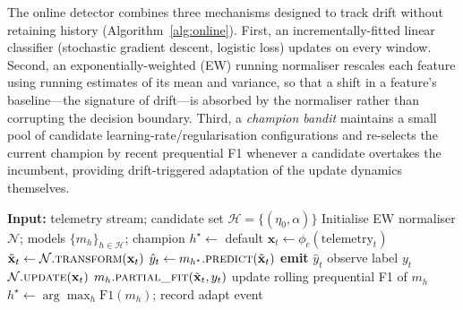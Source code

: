 \documentclass[pdflatex,sn-mathphys-num]{sn-jnl}%
\theoremstyle{thmstyleone}%
\theoremstyle{thmstyletwo}%
\theoremstyle{thmstylethree}%
\begin{document}
The online detector combines three mechanisms designed to track drift without retaining history (Algorithm~\ref{alg:online}). First, an incrementally-fitted linear classifier (stochastic gradient descent, logistic loss) updates on every window. Second, an exponentially-weighted (EW) running normaliser rescales each feature using running estimates of its mean and variance, so that a shift in a feature's baseline---the signature of drift---is absorbed by the normaliser rather than corrupting the decision boundary. Third, a \emph{champion bandit} maintains a small pool of candidate learning-rate/regularisation configurations and re-selects the current champion by recent prequential F1 whenever a candidate overtakes the incumbent, providing drift-triggered adaptation of the update dynamics themselves.

\begin{algorithm}[t]
\caption{Online-adaptive prequential detection}\label{alg:online}
\begin{algorithmic}[1]
\State \textbf{Input:} telemetry stream; candidate set $\mathcal{H}=\{(\eta_0,\alpha)\}$
\State Initialise EW normaliser $\mathcal{N}$; models $\{m_h\}_{h\in\mathcal{H}}$; champion $h^\star \gets$ default
  \State $\mathbf{x}_t \gets \phi_c(\text{telemetry}_t)$ 
  \State $\tilde{\mathbf{x}}_t \gets \mathcal{N}.\textsc{transform}(\mathbf{x}_t)$ 
  \State $\hat{y}_t \gets m_{h^\star}.\textsc{predict}(\tilde{\mathbf{x}}_t)$ 
  \State \textbf{emit} $\hat{y}_t$
  \State observe label $y_t$
  \State $\mathcal{N}.\textsc{update}(\mathbf{x}_t)$
   
     \State $m_h.\textsc{partial\_fit}(\tilde{\mathbf{x}}_t, y_t)$
     \State update rolling prequential F1 of $m_h$
  \EndFor
   
     \State $h^\star \gets \arg\max_h \text{F1}(m_h)$; record adapt event
  \EndIf
\EndFor
\end{algorithmic}
\end{algorithm}
\end{document}
